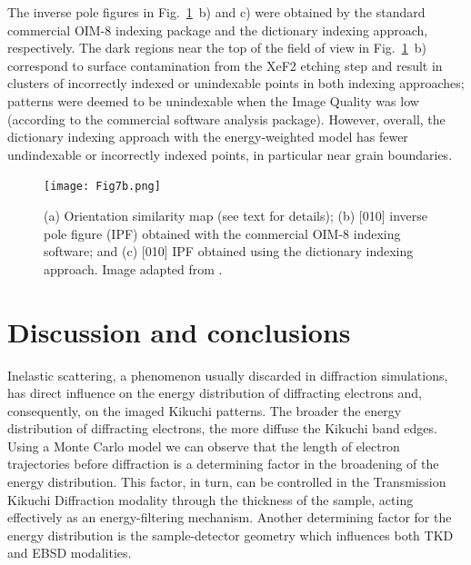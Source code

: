 The \hkl[010] inverse pole figures in Fig.~\ref{fig:TKDindex}~b) and c) were obtained by the standard commercial OIM-8 indexing package and the dictionary indexing approach, respectively. The dark regions near the top of the field of view in Fig.~\ref{fig:TKDindex}~b) correspond to surface contamination from the XeF2 etching step and result in clusters of incorrectly indexed or unindexable points in both indexing approaches; patterns were deemed to be unindexable when the Image Quality was low (according to the commercial software analysis package). However, overall, the dictionary indexing approach with the energy-weighted model has fewer undindexable or incorrectly indexed points, in particular near grain boundaries.

\begin{figure}[t]
\centering
\texttt{[image: Fig7b.png]}
\caption[Dictionary indexing TKD pattern]{ (a) Orientation similarity map (see text for details); (b) [010] inverse pole figure (IPF) obtained with the commercial OIM-8 indexing software; and (c) [010] IPF obtained using the dictionary indexing approach. Image adapted from \cite{PascalTKD}. }
\label{fig:TKDindex}
\end{figure}



%
\section{Discussion and conclusions \label{sec:discussion}}

Inelastic scattering, a phenomenon usually discarded in diffraction simulations, has direct influence on the energy distribution of diffracting electrons and, consequently, on the imaged Kikuchi patterns. The broader the energy distribution of diffracting electrons, the more diffuse the Kikuchi band edges. Using a Monte Carlo model we can observe that the length of electron trajectories before diffraction is a determining factor in the broadening of the energy distribution. This factor, in turn, can be controlled in the Transmission Kikuchi Diffraction modality through the thickness of the sample, acting effectively as an energy-filtering mechanism. Another determining factor for the energy distribution is the sample-detector geometry which influences both TKD and EBSD modalities.



